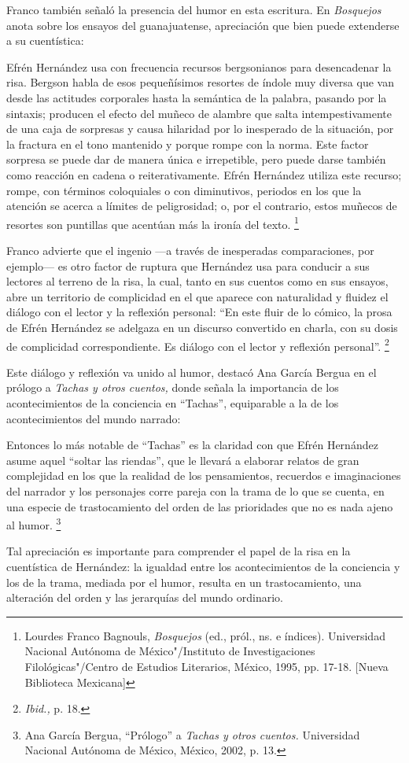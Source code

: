 \documentclass[14pt,twoside,final]{extbook} %
\let\oldfootnote\footnote
\renewcommand\footnote[1]{%
\oldfootnote{\hspace{1mm}#1}}
\begin{document}
Franco también señaló la presencia del humor en esta escritura. En \emph{Bosquejos} anota sobre los ensayos del guanajuatense, apreciación que bien puede extenderse a su cuentística:
\begin{quoting}
Efrén Hernández usa con frecuencia recursos bergsonianos para desencadenar la risa. Bergson habla de esos pequeñísimos resortes de índole muy diversa que van desde las actitudes corporales hasta la semántica de la palabra, pasando por la sintaxis; producen el efecto del muñeco de alambre que salta intempestivamente de una caja de sorpresas y causa hilaridad por lo inesperado de la situación, por la fractura en el tono mantenido y porque rompe con la norma. Este factor sorpresa se puede dar de manera única e irrepetible, pero puede darse también como reacción en cadena o reiterativamente. Efrén Hernández utiliza este recurso; rompe, con términos coloquiales o con diminutivos, periodos en los que la atención se acerca a límites de peligrosidad; o, por el contrario, estos muñecos de resortes son puntillas que acentúan más la ironía del texto.\footnote{Lourdes Franco Bagnouls, \emph{Bosquejos} (ed., pról., ns. e índices). Universidad Nacional Autónoma de México"/Instituto de Investigaciones Filológicas"/Centro de Estudios Literarios, México, 1995, pp. 17-18. [Nueva Biblioteca Mexicana]}
\end{quoting}
Franco advierte que el ingenio ---a través de inesperadas comparaciones, por ejemplo--- es otro factor de ruptura que Hernández usa para conducir a sus lectores al terreno de la risa, la cual, tanto en sus cuentos como en sus ensayos, abre un territorio de complicidad en el que aparece con naturalidad y fluidez el diálogo con el lector y la reflexión personal: ``En este fluir de lo cómico, la prosa de Efrén Hernández se adelgaza en un discurso convertido en charla, con su dosis de complicidad correspondiente. Es diálogo con el lector y reflexión personal''.\footnote{\emph{Ibid.,} p. 18.}

Este diálogo y reflexión va unido al humor, destacó Ana García Bergua en el prólogo a \emph{Tachas y otros cuentos,} donde señala la importancia de los acontecimientos de la conciencia en ``Tachas'', equiparable a la de los acontecimientos del mundo narrado:
\begin{quoting}
Entonces lo más notable de ``Tachas'' es la claridad con que Efrén Hernández asume aquel ``soltar las riendas'', que le llevará a elaborar relatos de gran complejidad en los que la realidad de los pensamientos, recuerdos e imaginaciones del narrador y los personajes corre pareja con la trama de lo que se cuenta, en una especie de trastocamiento del orden de las prioridades que no es nada ajeno al humor.\footnote{Ana García Bergua, ``Prólogo'' a \emph{Tachas y otros cuentos.} Universidad Nacional
Autónoma de México, México, 2002, p. 13.}
\end{quoting}
Tal apreciación es importante para comprender el papel de la risa en la cuentística de Hernández: la igualdad entre los acontecimientos de la conciencia y los de la trama, mediada por el humor, resulta en un trastocamiento, una alteración del orden y las jerarquías del mundo ordinario.
\end{document}
